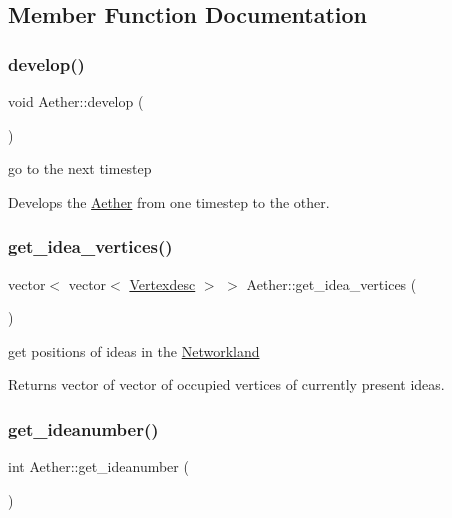 \subsection{Member Function Documentation}
\mbox{\label{classAether_aa26ea89dc9dc145479f8c2065121e76d}} 
\subsubsection{\texorpdfstring{develop()}{develop()}}
{\footnotesize\ttfamily void Aether\+::develop (\begin{DoxyParamCaption}{ }\end{DoxyParamCaption})}



go to the next timestep 

Develops the \hyperlink{classAether}{Aether} from one timestep to the other. \mbox{\label{classAether_a4203453890988736ebce82be4f51a965}} 
\subsubsection{\texorpdfstring{get\+\_\+idea\+\_\+vertices()}{get\_idea\_vertices()}}
{\footnotesize\ttfamily vector$<$ vector$<$ \hyperlink{Networkland_8h_af340ced64bd0b6914662d1b26be70b41}{Vertexdesc} $>$ $>$ Aether\+::get\+\_\+idea\+\_\+vertices (\begin{DoxyParamCaption}{ }\end{DoxyParamCaption})}



get positions of ideas in the \hyperlink{classNetworkland}{Networkland} 

Returns vector of vector of occupied vertices of currently present ideas. \mbox{\label{classAether_a7c03f99d5a7ae5b866b8fdabeab890aa}} 
\subsubsection{\texorpdfstring{get\+\_\+ideanumber()}{get\_ideanumber()}}
{\footnotesize\ttfamily int Aether\+::get\+\_\+ideanumber (\begin{DoxyParamCaption}{ }\end{DoxyParamCaption})}



